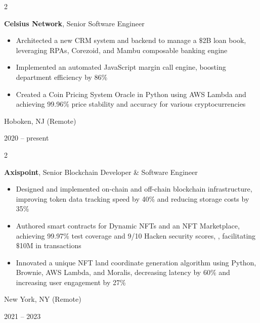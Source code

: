 \documentclass[10pt, letterpaper]{article}
\newenvironment{highlights}{
    \begin{itemize}[
        topsep=0.10 cm,
        parsep=0.10 cm,
        partopsep=0pt,
        itemsep=0pt,
        leftmargin=0.4 cm + 10pt
    ]
}{
    \end{itemize}
} %
\newenvironment{twocolentry}[2][]{
    \onecolentry
    \def\secondColumn{#2}
    \setcolumnwidth{\fill, 4.5 cm}
    \begin{paracol}{2}
}{
    \switchcolumn \raggedleft \secondColumn
    \end{paracol}
    \endonecolentry
} %
\begin{document}
        
        \begin{twocolentry}{
            Hoboken, NJ (Remote)

        2020 – present
        }
            \textbf{Celsius Network}, Senior Software Engineer
            \begin{highlights}
                \item Architected a new CRM system and backend to manage a $\mathdollar$2B loan book, leveraging RPAs, Corezoid, and Mambu composable banking engine
                \item Implemented an automated JavaScript margin call engine, boosting department efficiency by 86\%
                \item Created a Coin Pricing System Oracle in Python using AWS Lambda and achieving 99.96\% price stability and accuracy for various cryptocurrencies
            \end{highlights}
        \end{twocolentry}


        \vspace{0.2 cm}

        \begin{twocolentry}{
            New York, NY (Remote)

        2021 – 2023
        }
            \textbf{Axispoint}, Senior Blockchain Developer \& Software Engineer
            \begin{highlights}
                \item Designed and implemented on-chain and off-chain blockchain infrastructure, improving token data tracking speed by 40\% and reducing storage costs by 35\%
                \item Authored smart contracts for Dynamic NFTs and an NFT Marketplace, achieving 99.97\% test coverage and 9/10 Hacken security scores, , facilitating $\mathdollar$10M in transactions
                \item Innovated a unique NFT land coordinate generation algorithm using Python, Brownie, AWS Lambda, and Moralis, decreasing latency by 60\% and increasing user engagement by 27\%
            \end{highlights}
        \end{twocolentry}


        \vspace{0.2 cm}
\end{document}
